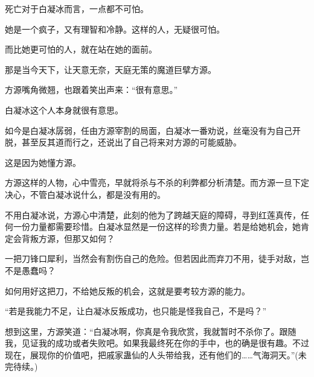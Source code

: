 \begin{this_body}
死亡对于白凝冰而言，一点都不可怕。

她是一个疯子，又有理智和冷静。这样的人，无疑很可怕。

而比她更可怕的人，就在站在她的面前。

那是当今天下，让天意无奈，天庭无策的魔道巨擘方源。

方源嘴角微翘，也跟着笑出声来：“很有意思。”

白凝冰这个人本身就很有意思。

如今是白凝冰孱弱，任由方源宰割的局面，白凝冰一番劝说，丝毫没有为自己开脱，甚至反其道而行之，还说出了自己将来对方源的可能威胁。

这是因为她懂方源。

方源这样的人物，心中雪亮，早就将杀与不杀的利弊都分析清楚。而方源一旦下定决心，不管白凝冰说什么，都是没有用的。

不用白凝冰说，方源心中清楚，此刻的他为了跨越天庭的障碍，寻到红莲真传，任何一份力量都需要珍惜。白凝冰显然是一份这样的珍贵力量。若是给她机会，她肯定会背叛方源，但那又如何？

一把刀锋口犀利，当然会有割伤自己的危险。但若因此而弃刀不用，徒手对敌，岂不是愚蠢吗？

如何用好这把刀，不给她反叛的机会，这就是要考较方源的能力。

“若是我能力不足，让白凝冰反叛成功，也只能是怪我自己，不是吗？”

想到这里，方源笑道：“白凝冰啊，你真是令我欣赏，我就暂时不杀你了。跟随我，见证我的成功或者失败吧。如果我最终死在你的手中，也的确是很有趣。不过现在，展现你的价值吧，把戚家蛊仙的人头带给我，还有他们的……气海洞天。”(未完待续。)

\end{this_body}

